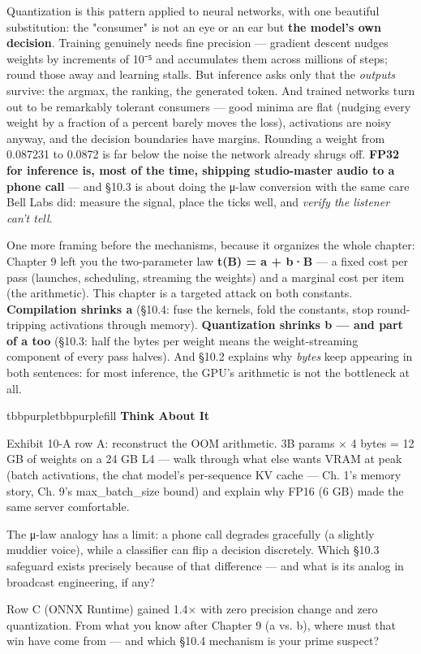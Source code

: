 Quantization is this pattern applied to neural networks, with one beautiful substitution: the "consumer" is not an eye or an ear but \textbf{the model's own decision}. Training genuinely needs fine precision — gradient descent nudges weights by increments of 10⁻⁵ and accumulates them across millions of steps; round those away and learning stalls. But inference asks only that the \textit{outputs} survive: the argmax, the ranking, the generated token. And trained networks turn out to be remarkably tolerant consumers — good minima are flat (nudging every weight by a fraction of a percent barely moves the loss), activations are noisy anyway, and the decision boundaries have margins. Rounding a weight from 0.087231 to 0.0872 is far below the noise the network already shrugs off. \textbf{FP32 for inference is, most of the time, shipping studio-master audio to a phone call} — and §10.3 is about doing the μ-law conversion with the same care Bell Labs did: measure the signal, place the ticks well, and \textit{verify the listener can't tell}.

One more framing before the mechanisms, because it organizes the whole chapter: Chapter 9 left you the two-parameter law \textbf{t(B) = a + b·B} — a fixed cost per pass (launches, scheduling, streaming the weights) and a marginal cost per item (the arithmetic). This chapter is a targeted attack on both constants. \textbf{Compilation shrinks a} (§10.4: fuse the kernels, fold the constants, stop round-tripping activations through memory). \textbf{Quantization shrinks b — and part of a too} (§10.3: half the bytes per weight means the weight-streaming component of every pass halves). And §10.2 explains why \textit{bytes} keep appearing in both sentences: for most inference, the GPU's arithmetic is not the bottleneck at all.

\begin{calloutbox}{tbbpurple}{tbbpurplefill}
{\normalsize\bfseries\color{tbbpurple}Think About It}\par\vspace{3pt}
\begin{tbbitemize}
  \item Exhibit 10-A row A: reconstruct the OOM arithmetic. 3B params × 4 bytes = 12 GB of weights on a 24 GB L4 — walk through what else wants VRAM at peak (batch activations, the chat model's per-sequence KV cache — Ch. 1's memory story, Ch. 9's max\_batch\_size bound) and explain why FP16 (6 GB) made the same server comfortable.
  \item The μ-law analogy has a limit: a phone call degrades gracefully (a slightly muddier voice), while a classifier can flip a decision discretely. Which §10.3 safeguard exists precisely because of that difference — and what is its analog in broadcast engineering, if any?
  \item Row C (ONNX Runtime) gained 1.4× with zero precision change and zero quantization. From what you know after Chapter 9 (a vs. b), where must that win have come from — and which §10.4 mechanism is your prime suspect?
\end{tbbitemize}
\end{calloutbox}

